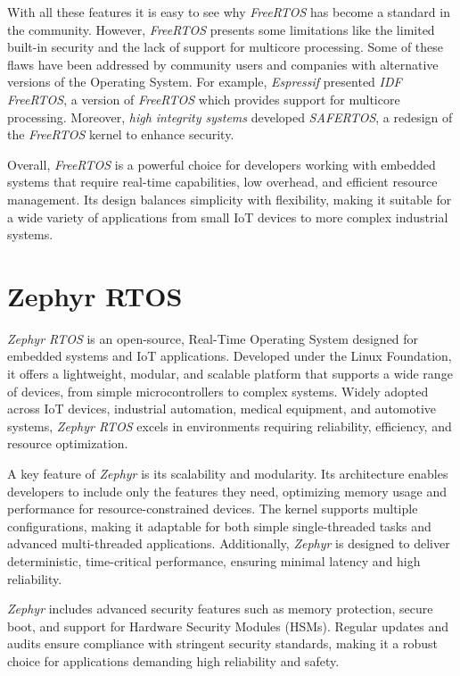 With all these features it is easy to see why \textit{FreeRTOS} has become a standard
in the community. However, \textit{FreeRTOS} presents some limitations like the
limited built-in security and the lack of support for multicore processing. Some
of these flaws have been addressed by community users and companies with alternative
versions of the Operating System. For example, \textit{Espressif} presented
\textit{IDF FreeRTOS}\cite{idfrtos}, a version of \textit{FreeRTOS} which
provides support for multicore processing. Moreover, \textit{high integrity
systems} developed \textit{SAFERTOS}\cite{safertos}, a redesign of the \textit{FreeRTOS}
kernel to enhance security.

Overall, \textit{FreeRTOS} is a powerful choice for developers working with embedded
systems that require real-time capabilities, low overhead, and efficient resource
management. Its design balances simplicity with flexibility, making it suitable for
a wide variety of applications from small IoT devices to more complex industrial
systems.

\section{Zephyr RTOS}
\label{sec:rtos_zephyr}

\textit{Zephyr RTOS}\cite{zephyrtos} is an open-source, Real-Time Operating System
designed for embedded systems and IoT applications. Developed under the Linux
Foundation, it offers a lightweight, modular, and scalable platform that supports
a wide range of devices, from simple microcontrollers to complex systems. Widely
adopted across IoT devices, industrial automation, medical equipment, and
automotive systems, \textit{Zephyr RTOS} excels in environments requiring
reliability, efficiency, and resource optimization.

A key feature of \textit{Zephyr} is its scalability and modularity. Its
architecture enables developers to include only the features they need, optimizing
memory usage and performance for resource-constrained devices. The kernel
supports multiple configurations, making it adaptable for both simple single-threaded
tasks and advanced multi-threaded applications. Additionally, \textit{Zephyr} is
designed to deliver deterministic, time-critical performance, ensuring minimal
latency and high reliability.

\textit{Zephyr} includes advanced security features such as memory protection,
secure boot, and support for Hardware Security Modules (HSMs). Regular updates
and audits ensure compliance with stringent security standards, making it a robust
choice for applications demanding high reliability and safety.

